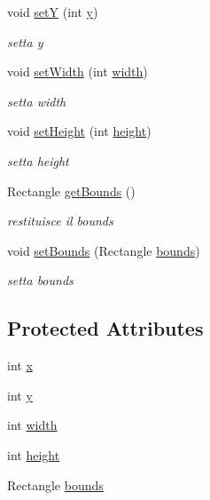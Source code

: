 \begin{DoxyCompactItemize}
void \hyperlink{classui_1_1_pause_button_adea78a9ff1234e75627dda61d972213b}{setY} (int \hyperlink{classui_1_1_pause_button_a0a2f84ed7838f07779ae24c5a9086d33}{y})
\begin{DoxyCompactList}\small\item\em setta y \end{DoxyCompactList}\item 
void \hyperlink{classui_1_1_pause_button_a8b4c8bccc530aa0a9b0139e04913af32}{set\+Width} (int \hyperlink{classui_1_1_pause_button_a2474a5474cbff19523a51eb1de01cda4}{width})
\begin{DoxyCompactList}\small\item\em setta width \end{DoxyCompactList}\item 
void \hyperlink{classui_1_1_pause_button_a7013185ad2825ade83994b396c4fdfcd}{set\+Height} (int \hyperlink{classui_1_1_pause_button_ad12fc34ce789bce6c8a05d8a17138534}{height})
\begin{DoxyCompactList}\small\item\em setta height \end{DoxyCompactList}\item 
Rectangle \hyperlink{classui_1_1_pause_button_a187945475e730bfa340a10f63224e91f}{get\+Bounds} ()
\begin{DoxyCompactList}\small\item\em restituisce il bounds \end{DoxyCompactList}\item 
void \hyperlink{classui_1_1_pause_button_a5871f92fa24387a8bcc54b945854b5ca}{set\+Bounds} (Rectangle \hyperlink{classui_1_1_pause_button_a62df0866a4faf552c81108aff64e8eff}{bounds})
\begin{DoxyCompactList}\small\item\em setta bounds \end{DoxyCompactList}\end{DoxyCompactItemize}
\subsection*{Protected Attributes}
\begin{DoxyCompactItemize}
\item 
int \hyperlink{classui_1_1_pause_button_a6150e0515f7202e2fb518f7206ed97dc}{x}
\item 
int \hyperlink{classui_1_1_pause_button_a0a2f84ed7838f07779ae24c5a9086d33}{y}
\item 
int \hyperlink{classui_1_1_pause_button_a2474a5474cbff19523a51eb1de01cda4}{width}
\item 
int \hyperlink{classui_1_1_pause_button_ad12fc34ce789bce6c8a05d8a17138534}{height}
\item 
Rectangle \hyperlink{classui_1_1_pause_button_a62df0866a4faf552c81108aff64e8eff}{bounds}
\end{DoxyCompactItemize}
